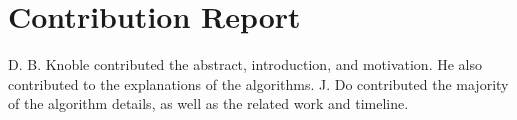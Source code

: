 \documentclass[11pt,conference]{IEEEtran}
\begin{document}
\section{Contribution Report}

D. B. Knoble contributed the abstract, introduction, and motivation. He also
contributed to the explanations of the algorithms. J. Do contributed the
majority of the algorithm details, as well as the related work and timeline.

{\printbibliography}
\end{document}
